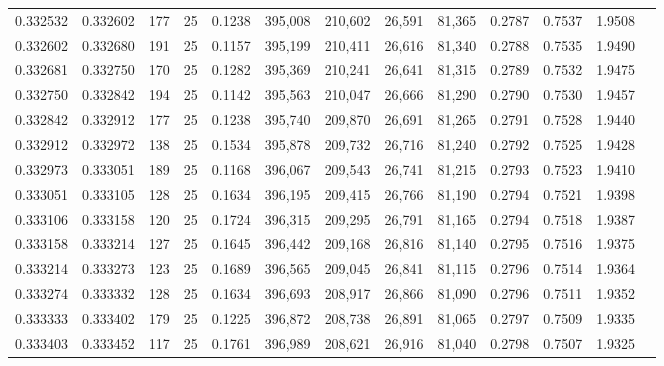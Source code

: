 \begin{tabular}{rrrrrrrrrrrrr}
0.332532 & 0.332602 &   177 &  25 &                                     0.1238 & 395,008 & 210,602 &  26,591 &  81,365 & 0.2787 & 0.7537 & 1.9508 \\
0.332602 & 0.332680 &   191 &  25 &                                     0.1157 & 395,199 & 210,411 &  26,616 &  81,340 & 0.2788 & 0.7535 & 1.9490 \\
0.332681 & 0.332750 &   170 &  25 &                                     0.1282 & 395,369 & 210,241 &  26,641 &  81,315 & 0.2789 & 0.7532 & 1.9475 \\
0.332750 & 0.332842 &   194 &  25 &                                     0.1142 & 395,563 & 210,047 &  26,666 &  81,290 & 0.2790 & 0.7530 & 1.9457 \\
0.332842 & 0.332912 &   177 &  25 &                                     0.1238 & 395,740 & 209,870 &  26,691 &  81,265 & 0.2791 & 0.7528 & 1.9440 \\
0.332912 & 0.332972 &   138 &  25 &                                     0.1534 & 395,878 & 209,732 &  26,716 &  81,240 & 0.2792 & 0.7525 & 1.9428 \\
0.332973 & 0.333051 &   189 &  25 &                                     0.1168 & 396,067 & 209,543 &  26,741 &  81,215 & 0.2793 & 0.7523 & 1.9410 \\
0.333051 & 0.333105 &   128 &  25 &                                     0.1634 & 396,195 & 209,415 &  26,766 &  81,190 & 0.2794 & 0.7521 & 1.9398 \\
0.333106 & 0.333158 &   120 &  25 &                                     0.1724 & 396,315 & 209,295 &  26,791 &  81,165 & 0.2794 & 0.7518 & 1.9387 \\
0.333158 & 0.333214 &   127 &  25 &                                     0.1645 & 396,442 & 209,168 &  26,816 &  81,140 & 0.2795 & 0.7516 & 1.9375 \\
0.333214 & 0.333273 &   123 &  25 &                                     0.1689 & 396,565 & 209,045 &  26,841 &  81,115 & 0.2796 & 0.7514 & 1.9364 \\
0.333274 & 0.333332 &   128 &  25 &                                     0.1634 & 396,693 & 208,917 &  26,866 &  81,090 & 0.2796 & 0.7511 & 1.9352 \\
0.333333 & 0.333402 &   179 &  25 &                                     0.1225 & 396,872 & 208,738 &  26,891 &  81,065 & 0.2797 & 0.7509 & 1.9335 \\
0.333403 & 0.333452 &   117 &  25 &                                     0.1761 & 396,989 & 208,621 &  26,916 &  81,040 & 0.2798 & 0.7507 & 1.9325 \\

\end{tabular}
